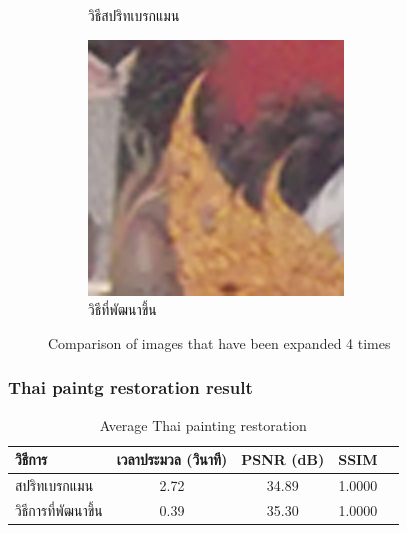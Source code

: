 \documentclass[xcolor=dvipsnames, xetex,serif]{beamer}
\begin{document}
\begin{frame}
\begin{figure}[H]
\begin{subfigure}{0.4\linewidth}
                \caption{วิธีสปริทเบรกแมน}
            \end{subfigure}
            \begin{subfigure}{0.4\linewidth}
                \centering
                \includegraphics[width=0.6\linewidth]{images/result_ex4_scaleup/multisplitbregman.png}	
                \caption{วิธีที่พัฒนาขึ้น}
            \end{subfigure}
            \caption{Comparison of images that have been expanded 4 times}
        \end{figure}
    \end{frame}
    \begin{frame}
        \frametitle{Thai paintg restoration result}
        \begin{table}[H]
            \centering
            \begin{tabular}[ht]{|l|c|c|c|c|}
                \hline
                วิธีการ  & เวลาประมวล  (วินาที) & PSNR (dB) & SSIM \\
                \hline
                สปริทเบรกแมน & 2.72 & 34.89 & 1.0000 \\ 
                วิธีการที่พัฒนาขึ้น & 0.39 & 35.30 & 1.0000 \\
                \hline
            \end{tabular}
            \caption{Average Thai painting restoration}
        \end{table}	
    \end{frame}
\end{document}
